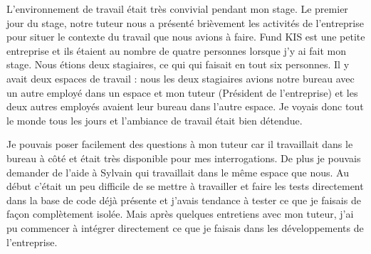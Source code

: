 L'environnement de travail était très convivial pendant mon stage. Le premier jour du stage, notre tuteur nous a présenté brièvement les activités de l'entreprise pour situer le contexte du travail que nous avions à faire. Fund KIS est une petite entreprise et ils étaient au nombre de quatre personnes lorsque j'y ai fait mon stage. Nous étions deux stagiaires, ce qui qui faisait en tout six personnes. Il y avait deux espaces de travail : nous les deux stagiaires avions notre bureau avec un autre employé dans un espace et mon tuteur (Président de l'entreprise) et les deux autres employés avaient leur bureau dans l'autre espace. Je voyais donc tout le monde tous les jours et l'ambiance de travail était bien détendue.

\vspace{3mm}

Je pouvais poser facilement des questions à mon tuteur car il travaillait dans le bureau à côté et était très disponible pour mes interrogations. De plus je pouvais demander de l'aide à Sylvain qui travaillait dans le même espace que nous. Au début c'était un peu difficile de se mettre à travailler et faire les tests directement dans la base de code déjà présente et j'avais tendance à tester ce que je faisais de façon complètement isolée. Mais après quelques entretiens avec mon tuteur, j'ai pu commencer à intégrer directement ce que je faisais dans les développements de l'entreprise.
